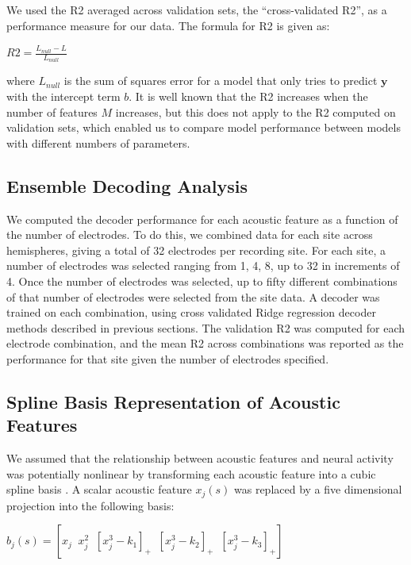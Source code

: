 We used the R2 averaged across validation sets, the ``cross-validated R2'', as a performance measure for our data. The formula for R2 is given as:

\begin{center}
$R2 = \frac{L_{null}-L}{L_{null}}$
\end{center}

where $L_{null}$ is the sum of squares error for a model that only tries to predict $\textbf{y}$ with the intercept term $b$. It is well known that the R2 increases when the number of features $M$ increases, but this does not apply to the R2 computed on validation sets, which enabled us to compare model performance between models with different numbers of parameters.


\subsection{Ensemble Decoding Analysis}

We computed the decoder performance for each acoustic feature as a function of the number of electrodes. To do this, we combined data for each site across hemispheres, giving a total of 32 electrodes per recording site. For each site, a number of electrodes was selected ranging from 1, 4, 8, up to 32 in increments of 4. Once the number of electrodes was selected, up to fifty different combinations of that number of electrodes were selected from the site data. A decoder was trained on each combination, using cross validated Ridge regression decoder methods described in previous sections. The validation R2 was computed for each electrode combination, and the mean R2 across combinations was reported as the performance for that site given the number of electrodes specified.

\subsection{Spline Basis Representation of Acoustic Features}

We assumed that the relationship between acoustic features and neural activity was potentially nonlinear by transforming each acoustic feature into a cubic spline basis \cite{Friedman2009}. A scalar acoustic feature $x_j (s)$ was replaced by a five dimensional projection into the following basis:

\begin{center}
$b_j (s) = [x_j \;\; x_j^2 \;\; [x_j^3 - k_1]_+ \;\; [x_j^3 - k_2]_+ \;\; [x_j^3 - k_3]_+ ]$
\end{center}


